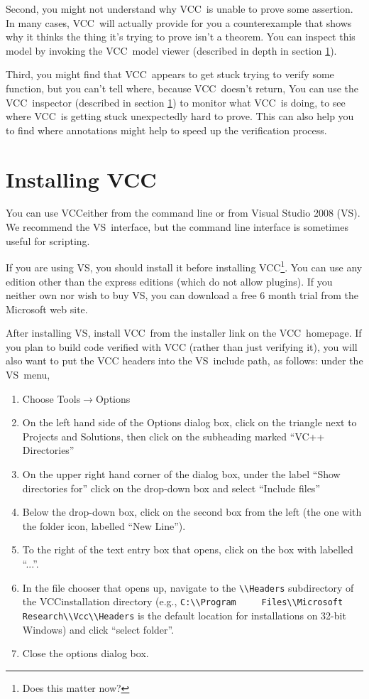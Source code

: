 \documentclass{report}
\newcommand{\Q}[1]{\lstinline~#1~}
\newcommand{\VS}{VS} %
\newcommand{\VCC}{VCC}
\newcommand{\Ref}[1]{section \ref{#1}}
\begin{document}
Second, you might not understand why \VCC\ is unable to prove some
assertion. In many cases, \VCC\ will actually provide for
you a counterexample that shows why it thinks the thing it's trying to
prove isn't a theorem. You can inspect this model by invoking the
\VCC\ model viewer (described in depth in \Ref{}).

Third, you might find that \VCC\ appears to get stuck trying to verify
some function, but you can't tell where, because \VCC\ doesn't return,
You can use the \VCC\ inspector (described in \Ref{}) to monitor what
\VCC\ is doing, to see where \VCC\ is getting stuck unexpectedly hard
to prove. This can also help you to find where annotations might help
to speed up the verification process.

\section{Installing \VCC} 
You can use \VCC either from the command line or from Visual Studio
2008 (\VS).  We recommend the \VS\ interface, but the command line interface
is sometimes useful for scripting.

If you are using \VS, you should install it before
installing \VCC\footnote{Does this matter now?}. You can use any
edition other than the express editions (which do not allow
plugins). If you neither own nor wish to buy \VS, you can download a
free 6 month trial from the Microsoft web site.

After installing \VS, install \VCC\ from the installer link on the
\VCC\ homepage. If you plan to build code verified with VCC (rather
than just verifying it), you will also want to put the VCC headers
into the \VS\ include path, as follows: under the \VS\ menu, 
\begin{enumerate}
\item Choose Tools$\rightarrow$Options
\item On the left hand side of the Options dialog box, click on the
  triangle next to Projects and Solutions, then click on the
  subheading marked ``VC++ Directories''
\item On the upper right hand corner of the dialog box, under the
  label ``Show directories for'' click on the drop-down box and select
  ``Include files''
\item Below the drop-down box, click on the second box from the left
  (the one with the folder icon, labelled ``New Line'').
\item To the right of the text entry box that opens, click on the box
  with labelled ``...''.
\item In the file chooser that opens up, navigate to the \Q{\\Headers}
  subdirectory of the \VCC installation directory (e.g., \Q{C:\\Program
    Files\\Microsoft Research\\Vcc\\Headers} is the default location for
  installations on 32-bit Windows) and click ``select folder''.
\item Close the options dialog box.
\end{enumerate}
\end{document}
